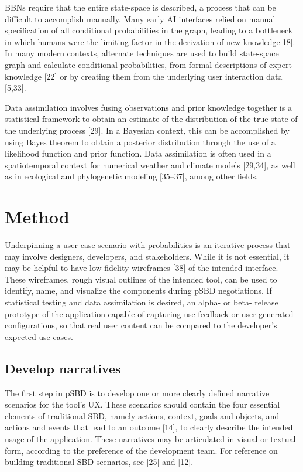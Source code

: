 \documentclass[]{article}
\begin{document}
BBNs require that the entire state-space is described, a process that
can be difficult to accomplish manually. Many early AI interfaces relied
on manual specification of all conditional probabilities in the graph,
leading to a bottleneck in which humans were the limiting factor in the
derivation of new knowledge{[}18{]}. In many modern contexts, alternate
techniques are used to build state-space graph and calculate conditional
probabilities, from formal descriptions of expert knowledge {[}22{]} or
by creating them from the underlying user interaction data {[}5,33{]}.

Data assimilation involves fusing observations and prior knowledge
together is a statistical framework to obtain an estimate of the
distribution of the true state of the underlying process {[}29{]}. In a
Bayesian context, this can be accomplished by using Bayes theorem to
obtain a posterior distribution through the use of a likelihood function
and prior function. Data assimilation is often used in a spatiotemporal
context for numerical weather and climate models {[}29,34{]}, as well as
in ecological and phylogenetic modeling {[}35--37{]}, among other
fields.

\section{Method}\label{method}

Underpinning a user-case scenario with probabilities is an iterative
process that may involve designers, developers, and stakeholders. While
it is not essential, it may be helpful to have low-fidelity wireframes
{[}38{]} of the intended interface. These wireframes, rough visual
outlines of the intended tool, can be used to identify, name, and
visualize the components during pSBD negotiations. If statistical
testing and data assimilation is desired, an alpha- or beta- release
prototype of the application capable of capturing use feedback or user
generated configurations, so that real user content can be compared to
the developer's expected use cases.

\subsection{Develop narratives}\label{develop-narratives}

The first step in pSBD is to develop one or more clearly defined
narrative scenarios for the tool's UX. These scenarios should contain
the four essential elements of traditional SBD, namely actions, context,
goals and objects, and actions and events that lead to an outcome
{[}14{]}, to clearly describe the intended usage of the application.
These narratives may be articulated in visual or textual form, according
to the preference of the development team. For reference on building
traditional SBD scenarios, see {[}25{]} and {[}12{]}.
\end{document}

